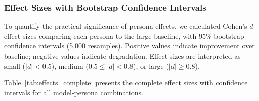 \documentclass{article}
\begin{document}
\subsubsection{Effect Sizes with Bootstrap Confidence Intervals}

To quantify the practical significance of persona effects, we calculated Cohen's $d$ effect sizes comparing each persona to the large baseline, with 95\% bootstrap confidence intervals (5,000 resamples). Positive values indicate improvement over baseline; negative values indicate degradation. Effect sizes are interpreted as small ($|d| < 0.5$), medium ($0.5 \le |d| < 0.8$), or large ($|d| \ge 0.8$).

Table~\ref{tab:effects_complete} presents the complete effect sizes with confidence intervals for all model-persona combinations.
\end{document}
